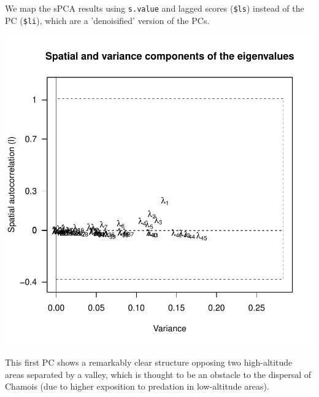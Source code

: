 \documentclass{article}
\begin{document}
We map the sPCA results using \texttt{s.value} and lagged scores (\texttt{\$ls}) instead of the PC (\texttt{\$li}), which are a
'denoisified' version of the PCs.
\begin{Schunk}
\end{Schunk}
\includegraphics{figs/spca-050}

\noindent This first PC shows a remarkably clear structure opposing two high-altitude areas
separated by a valley, which is thought to be an obstacle to the dispersal of Chamois (due to higher
exposition to predation in low-altitude areas).
\end{document}
